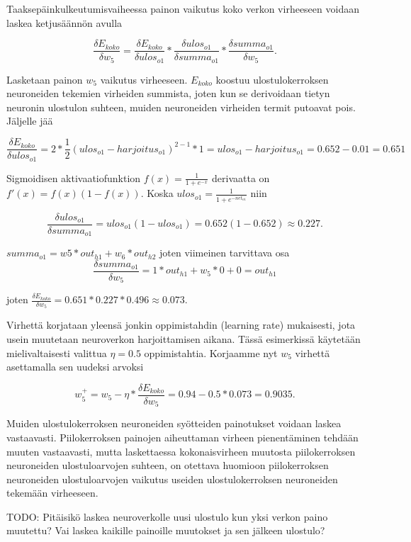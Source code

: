 \documentclass[finnish]{tktltiki2}
\theoremstyle{definition}
\theoremstyle{remark}
\begin{document}
  Taaksepäinkulkeutumisvaiheessa painon vaikutus koko verkon virheeseen voidaan laskea ketjusäännön avulla

  $$ \frac{\delta E_{koko}}{\delta w_5} = \frac{\delta E_{koko}}{\delta ulos_{o1}} * \frac{\delta ulos_{o1}}{\delta summa_{o1}} * \frac{\delta summa_{o1}}{\delta w_5}. $$

  Lasketaan painon $w_5$ vaikutus virheeseen. $E_{koko}$ koostuu ulostulokerroksen neuroneiden tekemien virheiden summista, joten kun se derivoidaan tietyn neuronin ulostulon suhteen, muiden neuroneiden virheiden termit putoavat pois. Jäljelle jää 
  
  $$ \frac{\delta E_{koko}}{\delta ulos_{o1}} = 2 * \frac{1}{2} (ulos_{o1} - harjoitus_{o1})^{2-1} * 1 = ulos_{o1} - harjoitus_{o1} = 0.652 - 0.01 = 0.651$$

  Sigmoidisen aktivaatiofunktion $ f(x) = \frac{1}{1 + e^{-x}}$ derivaatta on $f'(x) = f(x)(1 - f(x))$.
  Koska $ ulos_{o1} = \frac{1}{1+e^{-net_{o1}}} $ niin

  $$ \frac{\delta ulos_{o1}}{\delta summa_{o1}} = ulos_{o1}(1 - ulos_{o1}) = 0.652(1 - 0.652) \approx 0.227.$$

  $ summa_{o1} = w5 * out_{h1} + w_6 * out_{h2} $ joten viimeinen tarvittava osa 
  $$ \frac{\delta summa_{o1}}{\delta w_5} = 1 * out_{h1} + w_5 * 0 + 0 = out_{h1} $$ 

  joten $\frac{\delta E_{koko}}{\delta w_5} = 0.651 * 0.227 * 0.496 \approx 0.073 $.

  Virhettä korjataan yleensä jonkin oppimistahdin (learning rate) mukaisesti, jota usein muutetaan neuroverkon harjoittamisen aikana. Tässä esimerkissä käytetään mielivaltaisesti valittua $\eta = 0.5$ oppimistahtia. Korjaamme nyt $w_5$ virhettä asettamalla sen uudeksi arvoksi

  $$w_{5}^+ = w_5 - \eta * \frac{\delta E_{koko}}{\delta w_5} = 0.94 - 0.5 * 0.073 = 0.9035.$$

  Muiden ulostulokerroksen neuroneiden syötteiden painotukset voidaan laskea vastaavasti. Piilokerroksen painojen aiheuttaman virheen pienentäminen tehdään muuten vastaavasti, mutta laskettaessa kokonaisvirheen muutosta piilokerroksen neuroneiden ulostuloarvojen suhteen, on otettava huomioon piilokerroksen neuroneiden ulostuloarvojen vaikutus useiden ulostulokerroksen neuroneiden tekemään virheeseen.

  TODO: Pitäisikö laskea neuroverkolle uusi ulostulo kun yksi verkon paino muutettu? Vai laskea kaikille painoille muutokset ja sen jälkeen ulostulo?
\end{document}
